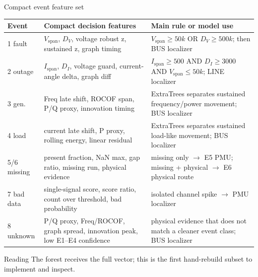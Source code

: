 \documentclass[aspectratio=169,10pt,t]{beamer}
\begin{document}
\begin{frame}{Compact event feature set}
\scriptsize
\centering
\renewcommand{\arraystretch}{0.86}
\begin{tabular}{p{}p{}p{}}
\toprule
\textbf{Event} & \textbf{Compact decision features} & \textbf{Main rule or model use}\\
\midrule
1 fault &
$V_{\mathrm{span}}$, $D_V$, voltage robust z, sustained z, graph timing &
$V_{\mathrm{span}}\ge50k$ OR $D_V\ge500k$; then BUS localizer\\
2 outage &
$I_{\mathrm{span}}$, $D_I$, voltage guard, current-angle delta, graph diff &
$I_{\mathrm{span}}\ge500$ AND $D_I\ge3000$ AND $V_{\mathrm{span}}\le50k$; LINE localizer\\
3 gen. &
Freq late shift, ROCOF span, P/Q proxy, innovation timing &
ExtraTrees separates sustained frequency/power movement; BUS localizer\\
4 load &
current late shift, P proxy, rolling energy, linear residual &
ExtraTrees separates sustained load-like movement; BUS localizer\\
5/6 missing &
present fraction, NaN max, gap ratio, missing run, physical evidence &
missing only $\rightarrow$ E5 PMU; missing + physical $\rightarrow$ E6 physical route\\
7 bad data &
single-signal score, score ratio, count over threshold, bad probability &
isolated channel spike $\rightarrow$ PMU localizer\\
8 unknown &
P/Q proxy, Freq/ROCOF, graph spread, innovation peak, low E1--E4 confidence &
physical evidence that does not match a cleaner event class; BUS localizer\\
\bottomrule
\end{tabular}
\vspace{1mm}
\begin{alertblock}{Reading}
The forest receives the full vector; this is the first hand-rebuild subset to implement and inspect.
\end{alertblock}
\end{frame}
\fi %
\end{document}
